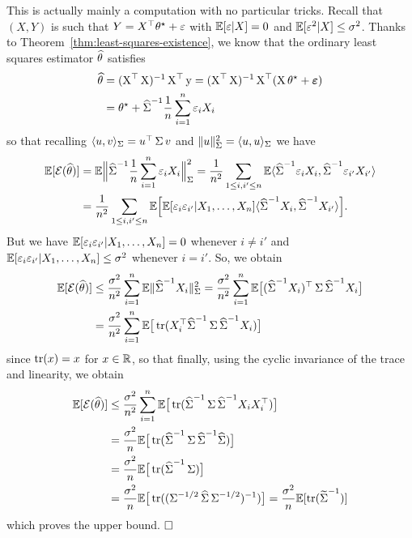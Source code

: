 This is actually mainly a computation with no particular tricks. 
Recall that $(X, Y)$ is such that $Y = X^\top \theta^\star + \eps$ with $\E[\eps | X] = 0$ and $\E[\eps^2 | X] \leq \sigma^2$.
Thanks to Theorem~\ref{thm:least-squares-existence}, we know that the ordinary least squares estimator $\wh \theta$ satisfies
\begin{align*}
	\wh \theta &= (\bX^\top \bX)^{-1} \bX^\top \by = (\bX^\top \bX)^{-1} \bX^\top (\bX \theta^\star + \beps) \\
		&= \theta^\star + \wh \bSigma^{-1} \frac{1}{n} \sum_{i=1}^n \eps_i X_i
\end{align*}
so that recalling $\inr{u, v}_{\bSigma} =u^\top \bSigma v$ and $\norm{u}_{\bSigma}^2 = \inr{u, u}_{\bSigma}$ we have
\begin{align*}
	\E [\cE(\wh \theta)] &= \E \Big\| \wh \bSigma^{-1} \frac{1}{n} \sum_{i=1}^n \eps_i X_i \Big \|_{\bSigma}^2
	 = \frac{1}{n^2} \sum_{1 \leq i, i' \leq n} \E \langle \wh \bSigma^{-1} \eps_i X_i, \wh \bSigma^{-1} \eps_{i'} X_{i'} \rangle \\
	 &= \frac{1}{n^2} \sum_{1 \leq i, i' \leq n} \E \Big[ \E [ \eps_i \eps_{i'} | X_1, \ldots, X_n] \langle \wh \bSigma^{-1}  X_i, \wh \bSigma^{-1} X_{i'} \rangle \Big].
\end{align*}
But we have $\E [ \eps_i \eps_{i'} | X_1, \ldots, X_n] = 0$ whenever $i \neq i'$ and $\E [ \eps_i \eps_{i'} | X_1, \ldots, X_n] \leq \sigma^2$ whenever $i=i'$. So, we obtain
\begin{align*}
	\E [\cE(\wh \theta)] &\leq \frac{\sigma^2}{n^2} \sum_{i=1}^n \E \norm{\wh \bSigma^{-1} X_i}_{\bSigma}^2 
	= \frac{\sigma^2}{n^2} \sum_{i=1}^n \E \big[ (\wh \bSigma^{-1} X_i)^\top \bSigma \wh \bSigma^{-1} X_i \big] \\
	&= \frac{\sigma^2}{n^2} \sum_{i=1}^n \E \big[ \tr (X_i^\top \wh \bSigma^{-1} \bSigma \wh \bSigma^{-1} X_i) \big]
\end{align*}
since $\tr(x) = x$ for $x \in \R$, so that finally, using the cyclic invariance of the trace and linearity, we obtain
\begin{align*}
	\E [\cE(\wh \theta)] &\leq \frac{\sigma^2}{n^2} \sum_{i=1}^n \E \big[ \tr (\wh \bSigma^{-1} \bSigma \wh \bSigma^{-1} X_i X_i^\top )\big] \\
	&= \frac{\sigma^2}{n} \E \big[ \tr (\wh \bSigma^{-1} \bSigma \wh \bSigma^{-1} \wh \bSigma)\big] \\
	&=\frac{\sigma^2}{n} \E \big[ \tr (\wh \bSigma^{-1} \bSigma)\big] \\
	&=\frac{\sigma^2}{n} \E \big[ \tr ( (\bSigma^{-1/2} \wh \bSigma \bSigma^{-1/2})^{-1}) \big] = \frac{\sigma^2}{n} \E[ \tr (\wt \bSigma^{-1}) ]
\end{align*}
which proves the upper bound. $\hfill \square$



